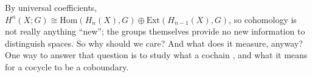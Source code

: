 \def\ccy{\Cyan}		  %
\def\cpb{\ProcessBlue}	  %
\def\csb{\SkyBlue}	  %
\def\ctu{\Turquoise}	  %
\def\ctb{\TealBlue}	  %
\def\caq{\Aquamarine}	  %
\def\cbg{\BlueGreen}	  %
\def\cem{\Emerald}	  %
\def\csg{\SeaGreen}	  %
\def\cgg{\Green}	  %
\def\cfg{\ForestGreen}	  %
\def\cpg{\PineGreen}	  %
\def\clg{\LimeGreen}	  %
\def\cyg{\YellowGreen}	  %
\def\cspg{\SpringGreen}	  %
\def\cog{\OliveGreen}	  %
\def\pars{\RawSienna}	  %
\def\cse{\Sepia}		  %
\def\cbr{\Brown}		  %
\def\cta{\Tan}		  %
\def\cgr{\Gray}		  %
\def\cbl{\Black}		  %
\def\cwh{\White}		  %


\loadmsbm



\def\ctln{\centerline}
\def\u{\underbar}
\def\ssk{\smallskip}
\def\msk{\medskip}
\def\bsk{\bigskip}
\def\hsk{\hskip.1in}
\def\hhsk{\hskip.2in}
\def\dsl{\displaystyle}
\def\hskp{\hskip1.5in}

\def\lra{$\Leftrightarrow$ }
\def\ra{\rightarrow}
\def\mpto{\logmapsto}
\def\pu{\pi_1}
\def\mpu{$\pi_1$}
\def\sig{\Sigma}
\def\msig{$\Sigma$}
\def\ep{\epsilon}
\def\sset{\subseteq}
\def\del{\partial}
\def\inv{^{-1}}
\def\wtl{\widetilde}
\def\del{\partial}
\def\delp{\partial^\prime}
\def\delpp{\partial^{\prime\prime}}
\def\sgn{{\roman{sgn}}}
\def\wtih{\widetilde{H}}
\def\bbz{{\Bbb Z}}
\def\bbr{{\Bbb R}}
\def\bbq{{\Bbb Q}}
\def\bbc{{\Bbb C}}
\def\hdsk{\hskip.7in}
\def\hdskb{\hskip.9in}
\def\hdskc{\hskip1.1in}
\def\hdskd{\hskip1.3in}
\def\Hom{\text{Hom}}
\def\Ext{\text{Ext}}
\def\larr{\leftarrow}



By universal coefficients, $H^n(X;G) \cong \Hom(H_n(X),G)\oplus \Ext(H_{n-1}(X),G)$, 
so cohomology is not really anything ``new''; the groups themselves provide no new
information to distinguish spaces. So why should we care? And what does it measure, 
anyway? One way to answer that question is to study what a cochain \u{is}, and what 
it means for a cocycle to \u{not} be a coboundary. 

